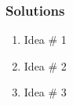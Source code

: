 \documentclass[mathserif,trans]{beamer}
\begin{document}
	\begin{frame}
		\frametitle{Solutions}
		\begin{block}{}
			\begin{enumerate}
			  \item Idea \# 1
			  \item Idea \# 2
			  \item Idea \# 3
			\end{enumerate}
		\end{block}
	\end{frame}
	




% 
% 
% 
\end{document}
